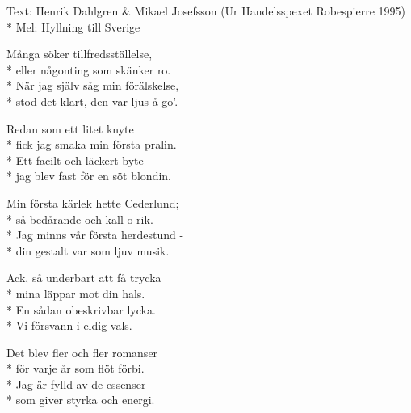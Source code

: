 \begin{SongText}
    \begin{SongInfo}
        Text: Henrik Dahlgren \& Mikael Josefsson (Ur Handelsspexet Robespierre 1995)\\*%
        Mel: Hyllning till Sverige
    \end{SongInfo}
    \begin{SongVerse}
        Många söker tillfredsställelse,\\*%
        eller någonting som skänker ro.\\*%
        När jag själv såg min förälskelse,\\*%
        stod det klart, den var ljus å go’.
    \end{SongVerse}
    \begin{SongVerse}
        Redan som ett litet knyte\\*%
        fick jag smaka min första pralin.\\*%
        Ett facilt och läckert byte -\\*%
        jag blev fast för en söt blondin.
    \end{SongVerse}
    \begin{SongVerse}
        Min första kärlek hette Cederlund;\\*%
        så bedårande och kall o rik.\\*%
        Jag minns vår första herdestund -\\*%
        din gestalt var som ljuv musik.
    \end{SongVerse}
    \begin{SongVerse}
        Ack, så underbart att få trycka\\*%
        mina läppar mot din hals.\\*%
        En sådan obeskrivbar lycka.\\*%
        Vi försvann i eldig vals.
    \end{SongVerse}
    \begin{SongVerse}
        Det blev fler och fler romanser\\*%
        för varje år som flöt förbi.\\*%
        Jag är fylld av de essenser\\*%
        som giver styrka och energi.
    \end{SongVerse}\end{SongText}
